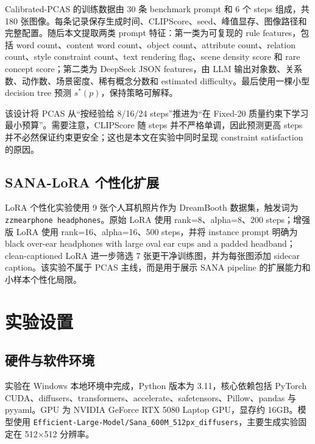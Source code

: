 \documentclass[UTF8,zihao=-4,fontset=fandol]{ctexart}
\newcommand{\clipscore}{\textrm{CLIPScore}}
\begin{document}
Calibrated-PCAS 的训练数据由 30 条 benchmark prompt 和 6 个 steps 组成，共 180 张图像。每条记录保存生成时间、\clipscore{}、seed、峰值显存、图像路径和完整配置。随后本文提取两类 prompt 特征：第一类为可复现的 rule features，包括 word count、content word count、object count、attribute count、relation count、style constraint count、text rendering flag、scene density score 和 rare concept score；第二类为 DeepSeek JSON features，由 LLM 输出对象数、关系数、动作数、场景密度、稀有概念分数和 estimated difficulty。最后使用一棵小型 decision tree 预测 $s^*(p)$，保持策略可解释。

该设计将 PCAS 从“按经验给 8/16/24 steps”推进为“在 Fixed-20 质量约束下学习最小预算”。需要注意，\clipscore{} 随 steps 并不严格单调，因此预测更高 steps 并不必然保证约束更安全；这也是本文在实验中同时呈现 constraint satisfaction 的原因。

\subsection{SANA-LoRA 个性化扩展}

LoRA 个性化实验使用 9 张个人耳机照片作为 DreamBooth 数据集，触发词为 \texttt{zzmearphone headphones}。原始 LoRA 使用 rank=8、alpha=8、200 steps；增强版 LoRA 使用 rank=16、alpha=16、500 steps，并将 instance prompt 明确为 black over-ear headphones with large oval ear cups and a padded headband；clean-captioned LoRA 进一步筛选 7 张更干净训练图，并为每张图添加 sidecar caption。该实验不属于 PCAS 主线，而是用于展示 SANA pipeline 的扩展能力和小样本个性化局限。

\section{实验设置}

\subsection{硬件与软件环境}

实验在 Windows 本地环境中完成，Python 版本为 3.11，核心依赖包括 PyTorch CUDA、diffusers、transformers、accelerate、safetensors、Pillow、pandas 与 pyyaml。GPU 为 NVIDIA GeForce RTX 5080 Laptop GPU，显存约 16GB。模型使用 \texttt{Efficient-Large-Model/Sana\_600M\_512px\_diffusers}，主要生成实验固定在 512$\times$512 分辨率。
\end{document}
